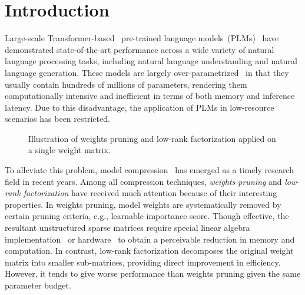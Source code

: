 \section{Introduction}
Large-scale Transformer-based~\cite{transformer} pre-trained language models~(PLMs)~\cite{bert,roberta,t5}  
have demonstrated state-of-the-art performance across a wide variety of natural language 
processing tasks, including natural language understanding and natural language generation. 
These models are largely over-parametrized~\cite{overpara} in that they usually contain 
hundreds of millions of parameters, rendering them computationally intensive and inefficient in terms 
of both memory and inference latency. Due to this disadvantage, the application of 
PLMs in low-resource scenarios has been restricted.

\begin{figure}[th]
	\centering
	\caption{Illustration of weights pruning and low-rank factorization applied on a single weight matrix.}
	\label{fig:intro}
\end{figure}

To alleviate this problem, model compression~\cite{kd,mag,l0,svd} has emerged as a 
timely research field in recent years. Among all compression techniques, \textit{weights pruning} 
and \textit{low-rank factorization} have received much attention because of their interesting properties.
In weights pruning, model weights are systematically removed by certain pruning criteria, e.g., learnable importance score. Though effective, the resultant unstructured sparse matrices require special linear algebra implementation~\cite{yao} or hardware~\cite{cao} to obtain a perceivable reduction in memory and computation. In contrast, low-rank factorization decomposes the original weight matrix into smaller sub-matrices, providing direct improvement in efficiency. However, it tends to give worse performance than weights pruning given the same parameter budget.

